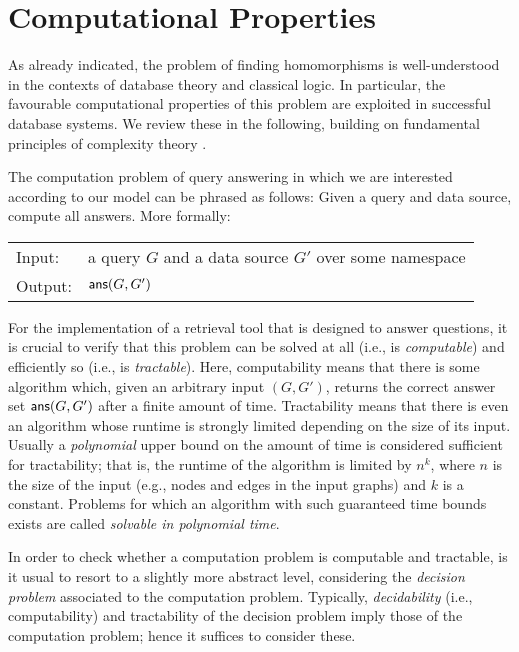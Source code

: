 \section{Computational Properties}
\label{sec:decision_problems}
\label{sec:decision_procedures}
\label{sec:computational_properties}

As already indicated, the problem of finding homomorphisms is well-understood in the contexts of
database theory and classical logic. In particular, the favourable computational properties of this problem
are exploited in successful database systems. We review these in the following,
building on fundamental principles of complexity theory \autocite{Arora2009}.

The computation problem of query answering in which we are interested according to our model can be 
phrased as follows: Given a query and data source, compute all answers.
More formally:

\begin{center}
  \begin{tabular}{ll}
    \hline\rule{0pt}{12pt}%
    Input:  & a query $G$ and a data source $G'$ over some namespace \namespace \\[2pt]
    Output: & $\textsf{ans}(G,G')$ \\[1pt]
    \hline
  \end{tabular}
\end{center}

For the implementation of a retrieval tool that is designed to answer questions,
it is crucial to verify that this problem can be solved at all (i.e., is \emph{computable})
and efficiently so (i.e., is \emph{tractable}).%
Here, computability means that there is some algorithm
which, given an arbitrary input $(G,G')$, returns the correct answer set $\textsf{ans}(G,G')$
after a finite amount of time.
Tractability means that there is even an algorithm whose runtime is strongly limited
depending on the size of its input.
Usually a \emph{polynomial} upper bound on the amount of time is
considered sufficient for tractability; that is, the runtime of the algorithm
is limited by $n^k$, where $n$ is the size of the input (e.g., nodes and edges in the input graphs)
and $k$ is a constant. Problems for which an algorithm with such guaranteed time bounds exists
are called \emph{solvable in polynomial time}.

In order to check whether a computation problem is computable and tractable,
is it usual to resort to a slightly more abstract level,
considering the \emph{decision problem} associated to the computation problem.
Typically, \emph{decidability} (i.e., computability) and tractability of
the decision problem imply those of the computation problem;
hence it suffices to consider these.

